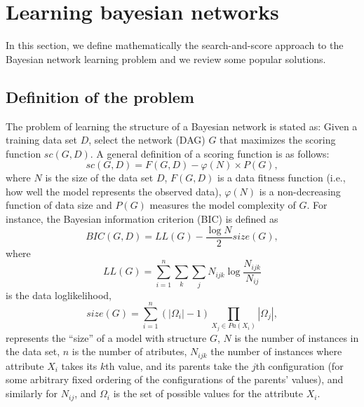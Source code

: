 \section{Learning bayesian networks}
\label{sec:learning}

In this section, we define mathematically the search-and-score approach
to the Bayesian network learning problem and we review some popular
solutions.

\subsection{Definition of the problem}
\label{subsec:definition}

The problem of learning the structure of a Bayesian network is stated as: Given a training data set $D $, select the network (DAG) $G$ that maximizes the scoring function ${sc}( G , D )$.
A general definition of a scoring function is as follows:
	\begin{equation}
		\label{eq:scoringfunction}
		{sc}( G , D ) = F( G, D ) - \varphi( N ) \times P( G ) ,
	\end{equation}
where $N$ is the size of the data set $D$, $F( G, D )$ is a data fitness function (i.e., how well the model represents the observed data), $\varphi( N )$ is a non-decreasing function of data size and $P( G )$ measures the model complexity of $G$. For instance,  the Bayesian information criterion (BIC) is defined as
	\begin{equation}
		\label{eq:bicscore}
		{BIC}( G , D ) = {LL}( G ) - \frac{\log N}{2} {size}( G ) ,
	\end{equation}
where
	\begin{equation}
		\label{eq:dataloglikelihood}
		{LL}( G ) = \sum_{i=1}^{n} \sum_{k} \sum_{j} N_{ijk} \log \frac{N_{ijk}}{N_{ij}}
	\end{equation}
is the data loglikelihood, 
	\begin{equation}
		\label{eq:size}
		{size}( G ) = \sum_{i=1}^{n} ( |\Omega_i| - 1 ) \prod_{X_j \in {Pa}( X_i )} |\Omega_j| ,
	\end{equation}
represents the ``size'' of a model with structure $G$, 
$N$ is the number of instances in the data set, $n$ is the number of atributes, $N_{ijk}$ the number of instances where attribute $X_i$ takes its $k$th value, and its parents take the $j$th configuration (for some arbitrary fixed ordering of the configurations of the parents' values), and similarly  for $N_{ij}$, and $\Omega_i$ is the set of possible values for the attribute $X_i$.


